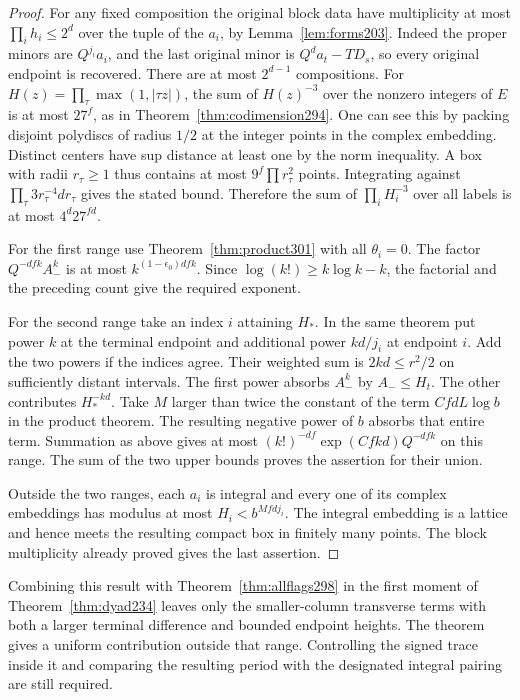 \documentclass[a4paper,11pt]{article}
\theoremstyle{definition}
\theoremstyle{remark}
\numberwithin{equation}{section}
\begin{document}
\begin{proof}
For any fixed composition the original block data have
multiplicity at most \(\prod_i h_i\le2^d\) over the tuple of
the \(a_i\), by Lemma~\ref{lem:forms203}. Indeed the proper
minors are \(Q^{j_i}a_i\), and the last original minor is
\(Q^d a_t-TD_s\), so every original endpoint is recovered.
There are at most \(2^{d-1}\) compositions. For
\(H(z)=\prod_\tau\max(1,|\tau z|)\), the sum of \(H(z)^{-3}\)
over the nonzero integers of \(E\) is at most \(27^f\), as
in Theorem~\ref{thm:codimension294}. One can see this by
packing disjoint polydiscs of radius \(1/2\) at the integer
points in the complex embedding. Distinct centers have sup
distance at least one by the norm inequality. A box with
radii \(r_\tau\ge1\) thus contains at most
\(9^f\prod r_\tau^2\) points. Integrating against
\(\prod_\tau 3r_\tau^{-4}dr_\tau\) gives the stated bound.
Therefore the sum of \(\prod_i H_i^{-3}\) over all labels
is at most \(4^d 27^{fd}\).

For the first range use Theorem~\ref{thm:product301} with
all \(\theta_i=0\). The factor \(Q^{-dfk} A_-^k\) is at
most \(k^{(1-\epsilon_0)dfk}\). Since
\(\log(k!)\ge k\log k-k\), the factorial and the preceding
count give the required exponent.

For the second range take an index \(i\) attaining \(H_*\).
In the same theorem put power \(k\) at the terminal endpoint
and additional power \(kd/j_i\) at endpoint \(i\). Add the
two powers if the indices agree. Their weighted sum is
\(2kd\le r^2/2\) on sufficiently distant intervals.
The first power absorbs \(A_-^k\) by \(A_-\le H_t\).
The other contributes \(H_*^{-kd}\). Take \(M\) larger than
twice the constant of the term \(CfdL\log b\) in the product
theorem. The resulting negative power of \(b\) absorbs
that entire term. Summation as above gives at most
\((k!)^{-df}\exp(Cfkd)Q^{-dfk}\) on this range. The sum of
the two upper bounds proves the assertion for their union.

Outside the two ranges, each \(a_i\) is integral and every
one of its complex embeddings has modulus at most
\(H_i<b^{Mfdj_i}\). The integral embedding is a lattice
and hence meets the resulting compact box in finitely many
points. The block multiplicity already proved gives the
last assertion.
\end{proof}

Combining this result with Theorem~\ref{thm:allflags298}
in the first moment of Theorem~\ref{thm:dyad234} leaves only
the smaller-column transverse terms with both a larger terminal
difference and bounded endpoint heights. The theorem gives
a uniform contribution outside that range. Controlling the
signed trace inside it and comparing the resulting period
with the designated integral pairing are still required.
\end{document}

